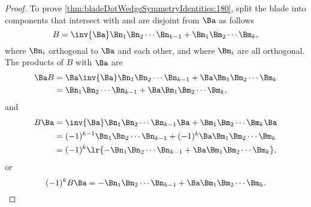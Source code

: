 \begin{proof}
To prove \cref{thm:bladeDotWedgeSymmetryIdentities:180}, split the blade into components that intersect with and are disjoint from \( \Ba \) as follows
\begin{equation}\label{eqn:bladeDotWedgeSymmetryIdentitiesTheorem:240}
B
=
\inv{\Ba} \Bn_1 \Bn_2 \cdots \Bn_{k-1} + \Bm_1 \Bm_2 \cdots \Bm_k,
\end{equation}
where \( \Bn_i \) orthogonal to \( \Ba \) and each other, and where \( \Bm_i \) are all orthogonal.  The products of \( B \) with \( \Ba \) are
\begin{equation}\label{eqn:bladeDotWedgeSymmetryIdentitiesTheorem:340}
\begin{aligned}
\Ba B
&= \Ba \inv{\Ba} \Bn_1 \Bn_2 \cdots \Bn_{k-1} + \Ba \Bm_1 \Bm_2 \cdots \Bm_k \\
&= \Bn_1 \Bn_2 \cdots \Bn_{k-1} + \Ba \Bm_1 \Bm_2 \cdots \Bm_k,
\end{aligned}
\end{equation}
and
\begin{equation}\label{eqn:bladeDotWedgeSymmetryIdentitiesTheorem:360}
\begin{aligned}
B \Ba
&= \inv{\Ba} \Bn_1 \Bn_2 \cdots \Bn_{k-1} \Ba + \Bm_1 \Bm_2 \cdots \Bm_k \Ba \\
&= (-1)^{k-1} \Bn_1 \Bn_2 \cdots \Bn_{k-1} + (-1)^k \Ba \Bm_1 \Bm_2 \cdots \Bm_k \\
&= (-1)^k \lr{ - \Bn_1 \Bn_2 \cdots \Bn_{k-1} + \Ba \Bm_1 \Bm_2 \cdots \Bm_k },
\end{aligned}
\end{equation}
or
\begin{equation}\label{eqn:bladeDotWedgeSymmetryIdentitiesTheorem:380}
(-1)^k B \Ba
=
- \Bn_1 \Bn_2 \cdots \Bn_{k-1} + \Ba \Bm_1 \Bm_2 \cdots \Bm_k.
\end{equation}


\end{proof}
